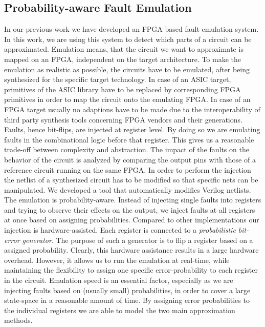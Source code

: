 \documentclass[conference]{IEEEtran}
\begin{document}
\subsection{Probability-aware Fault Emulation}
In our previous work we have developed an FPGA-based fault emulation system. In this work, we are using this system to detect which parts of a circuit can be approximated. Emulation means, that the circuit we want to approximate is mapped on an FPGA, independent on the target architecture. To make the emulation as realistic as possible, the circuits have to be emulated, after being synthesized for the specific target technology. In case of an ASIC target, primitives of the ASIC library have to be replaced by corresponding FPGA primitives in order to map the circuit onto the emulating FPGA. In case of an FPGA target usually no adaptions have to be made due to the interoperability of third party synthesis tools concerning FPGA vendors and their generations. Faults, hence bit-flips, are injected at register level. By doing so we are emulating faults in the combinational logic before that register. This gives us a reasonable trade-off between complexity and abstraction. The impact of the faults on the behavior of the circuit is analyzed by comparing the output pins with those of a reference circuit running on the same FPGA. In order to perform the injection the netlist of a synthesized circuit has to be modified so that specific nets can be manipulated. We developed a tool that automatically modifies Verilog netlists. The emulation is probability-aware. Instead of injecting single faults into registers and trying to observe their effects on the output, we inject faults at all registers at once based on assigning probabilities. Compared to other implementations our injection is hardware-assisted. Each register is connected to a \emph{probabilistic bit-error generator}. The purpose of such a generator is to flip a register based on a assigned probability. Clearly, this hardware assistance results in a large hardware overhead. However, it allows us to run the emulation at real-time, while maintaining the flexibility to assign one specific error-probability to each register in the circuit. Emulation speed is an essential factor, especially as we are injecting faults based on (usually small) probabilities, in order to cover a large state-space in a reasonable amount of time. By assigning error probabilities to the individual registers we are able to model the two main approximation methods.
\end{document}
